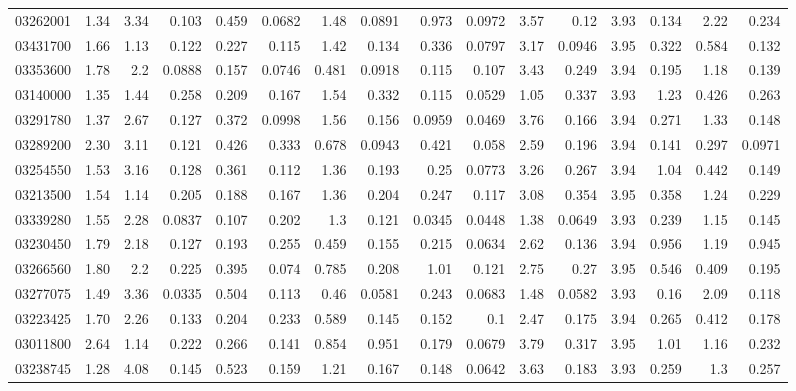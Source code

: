 \begin{longtable}{l r rr rr rr rr rr rr rr}
03262001 & 1.34 & 3.34 & {0.103} & 0.459 & {0.0682} & 1.48 & {0.0891} & 0.973 & {0.0972} & 3.57 & {0.12} & 3.93 & {0.134} & 2.22 & {0.234}\\
03431700 & 1.66 & 1.13 & {0.122} & 0.227 & {0.115} & 1.42 & {0.134} & 0.336 & {0.0797} & 3.17 & {0.0946} & 3.95 & {0.322} & 0.584 & {0.132}\\
03353600 & 1.78 & 2.2 & {0.0888} & 0.157 & {0.0746} & 0.481 & {0.0918} & 0.115 & {0.107} & 3.43 & {0.249} & 3.94 & {0.195} & 1.18 & {0.139}\\
03140000 & 1.35 & 1.44 & {0.258} & 0.209 & {0.167} & 1.54 & {0.332} & 0.115 & {0.0529} & 1.05 & {0.337} & 3.93 & {1.23} & 0.426 & {0.263}\\
03291780 & 1.37 & 2.67 & {0.127} & 0.372 & {0.0998} & 1.56 & {0.156} & 0.0959 & {0.0469} & 3.76 & {0.166} & 3.94 & {0.271} & 1.33 & {0.148}\\
03289200 & 2.30 & 3.11 & {0.121} & 0.426 & {0.333} & 0.678 & {0.0943} & 0.421 & {0.058} & 2.59 & {0.196} & 3.94 & {0.141} & 0.297 & {0.0971}\\
03254550 & 1.53 & 3.16 & {0.128} & 0.361 & {0.112} & 1.36 & {0.193} & 0.25 & {0.0773} & 3.26 & {0.267} & 3.94 & {1.04} & 0.442 & {0.149}\\
03213500 & 1.54 & 1.14 & {0.205} & 0.188 & {0.167} & 1.36 & {0.204} & 0.247 & {0.117} & 3.08 & {0.354} & 3.95 & {0.358} & 1.24 & {0.229}\\
03339280 & 1.55 & 2.28 & {0.0837} & 0.107 & 0.202 & 1.3 & {0.121} & 0.0345 & 0.0448 & 1.38 & {0.0649} & 3.93 & {0.239} & 1.15 & {0.145}\\
03230450 & 1.79 & 2.18 & {0.127} & 0.193 & 0.255 & 0.459 & {0.155} & 0.215 & {0.0634} & 2.62 & {0.136} & 3.94 & {0.956} & 1.19 & {0.945}\\
03266560 & 1.80 & 2.2 & {0.225} & 0.395 & {0.074} & 0.785 & {0.208} & 1.01 & {0.121} & 2.75 & {0.27} & 3.95 & {0.546} & 0.409 & {0.195}\\
03277075 & 1.49 & 3.36 & {0.0335} & 0.504 & {0.113} & 0.46 & {0.0581} & 0.243 & {0.0683} & 1.48 & {0.0582} & 3.93 & {0.16} & 2.09 & {0.118}\\
03223425 & 1.70 & 2.26 & {0.133} & 0.204 & 0.233 & 0.589 & {0.145} & 0.152 & {0.1} & 2.47 & {0.175} & 3.94 & {0.265} & 0.412 & {0.178}\\
03011800 & 2.64 & 1.14 & {0.222} & 0.266 & {0.141} & 0.854 & 0.951 & 0.179 & {0.0679} & 3.79 & {0.317} & 3.95 & {1.01} & 1.16 & {0.232}\\
03238745 & 1.28 & 4.08 & {0.145} & 0.523 & {0.159} & 1.21 & {0.167} & 0.148 & {0.0642} & 3.63 & {0.183} & 3.93 & {0.259} & 1.3 & {0.257}\\

\end{longtable}
